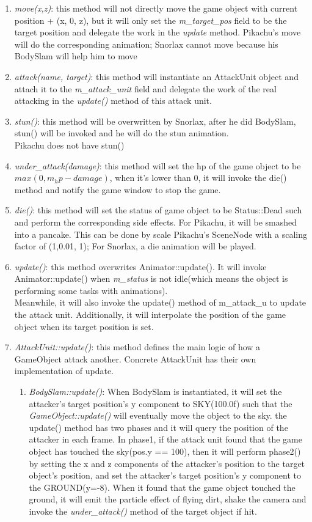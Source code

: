\documentclass {article}
\begin{document}
\begin{enumerate}
    \item \textit{move(x,z)}: this method will not directly move the game object with current position + (x, 0, z), but it will only set the \textit{m\_target\_pos} field to be the target position 
    and delegate the work in the \textit{update} method. Pikachu's move will do the corresponding animation; Snorlax cannot move because his BodySlam will help him to move
    \item \textit{attack(name, target)}: this method will instantiate an AttackUnit object and attach it to the \textit{m\_attack\_unit} field and 
    delegate the work of the real attacking in the \textit{update()} method of this attack unit.
    \item \textit{stun()}: this method will be overwritten by Snorlax, after he did BodySlam, stun() will be invoked and he will do the stun animation.
    \\ Pikachu does not have stun()
    \item \textit{under\_attack(damage)}: this method will set the hp of the game object to be $max(0, m_hp-damage)$, when it's lower than 0, it will invoke the die() method and notify the game window to stop the game.
    \item \textit{die()}: this method will set the status of game object to be Status::Dead such and perform the corresponding side effects. For Pikachu, it will be smashed into a pancake. This can be done by scale Pikachu's 
    SceneNode with a scaling factor of (1,0.01, 1); For Snorlax, a die animation will be played.
    \item \textit{update()}: this method overwrites Animator::update(). It will invoke Animator::update() when \textit{m\_status} is not idle(which means the object is performing some tasks with animations).
    \\ Meanwhile, it will also invoke the update() method of m\_attack\_u to update the attack unit. Additionally, it will interpolate the position of the game object when its target position is set.
    \item \textit{AttackUnit::update()}: this method defines the main logic of how a GameObject attack another. Concrete AttackUnit has their own implementation of update.
    \begin{enumerate}
        \item \textit{BodySlam::update()}: When BodySlam is instantiated, it will set the attacker's target position's y component to SKY(100.0f) such that the \textit{GameObject::update()} will eventually move the object to the sky. the update() method has two phases and it will query the position of the attacker in each frame.
        In phase1, if the attack unit found that the game object has touched the sky(pos.y == 100), then it will perform phase2() by setting the x and z components of the attacker's position to the target object's position, and set the attacker's
        target position's y component to the GROUND(y=-8). When it found that the game object touched the ground, it will emit the particle effect of flying dirt, shake the camera and invoke the \textit{under\_attack()} method
        of the target object if hit.


\end{enumerate}
\end{enumerate}
\end{document}
